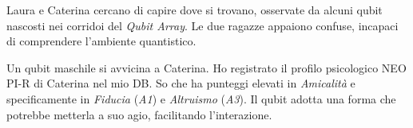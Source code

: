 \begin{center}
\begin{minipage}{0.7\textwidth}
    \centering
\end{minipage}
\end{center}


Laura e Caterina cercano di capire dove si trovano, osservate da alcuni qubit nascosti nei corridoi del \textit{Qubit Array}. Le due ragazze appaiono confuse, incapaci di comprendere l'ambiente quantistico.

Un qubit maschile si avvicina a Caterina. Ho registrato il profilo psicologico NEO PI-R di Caterina nel mio DB. So che ha punteggi elevati in \textit{Amicalità} e specificamente in \textit{Fiducia} (\textit{A1}) e \textit{Altruismo} (\textit{A3}). Il qubit adotta una forma che potrebbe metterla a suo agio, facilitando l'interazione. 

